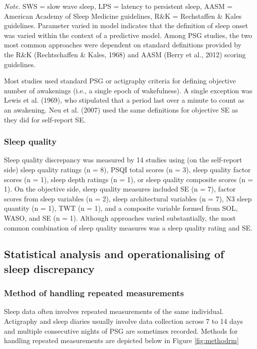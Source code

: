 \documentclass[
]{article}
\begin{document}
\emph{Note.} SWS = slow wave sleep, LPS = latency to persistent sleep, AASM = American Academy of Sleep Medicine guidelines, R\&K = Rechstaffen \& Kales guidelines. Parameter varied in model indicates that the definition of sleep onset was varied within the context of a predictive model. Among PSG studies, the two most common approaches were dependent on standard definitions provided by the R\&K (Rechtschaffen \& Kales, 1968) and AASM (Berry et al., 2012) scoring guidelines.

Most studies used standard PSG or actigraphy criteria for defining objective number of awakenings (i.e., a single epoch of wakefulness). A single exception was Lewis et al. (1969), who stipulated that a period last over a minute to count as an awakening. Neu et al. (2007) used the same definitions for objective SE as they did for self-report SE.

\subsubsection{Sleep quality}\label{sleep-quality}

Sleep quality discrepancy was measured by 14 studies using (on the self-report side) sleep quality ratings (n = 8), PSQI total scores (n = 3), sleep quality factor scores (n = 1), sleep depth ratings (n = 1), or sleep quality composite scores (n = 1). On the objective side, sleep quality measures included SE (n = 7), factor scores from sleep variables (n = 2), sleep architectural variables (n = 7), N3 sleep quantity (n = 1), TWT (n = 1), and a composite variable formed from SOL, WASO, and SE (n = 1). Although approaches varied substantially, the most common combination of sleep quality measures was a sleep quality rating and SE.

\subsection{Statistical analysis and operationalising of sleep discrepancy}\label{statistical-analysis-and-operationalising-of-sleep-discrepancy}

\subsubsection{Method of handling repeated measurements}\label{method-of-handling-repeated-measurements}

Sleep data often involves repeated measurements of the same individual. Actigraphy and sleep diaries usually involve data collection across 7 to 14 days and multiple consecutive nights of PSG are sometimes recorded. Methods for handling repeated measurements are depicted below in Figure \ref{fig:methodrm}
\end{document}
